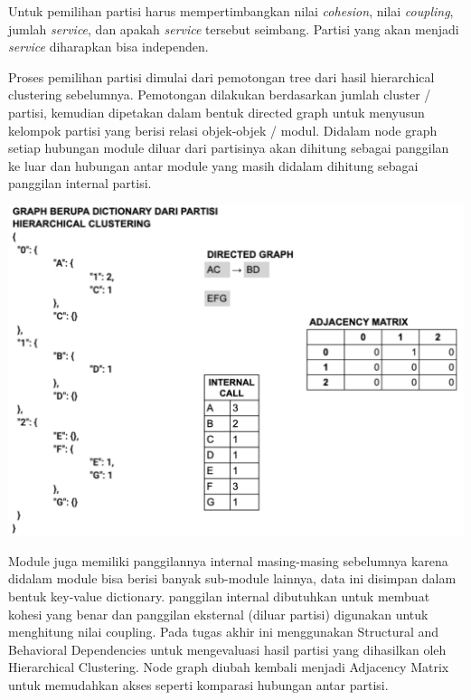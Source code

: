 Untuk pemilihan partisi harus mempertimbangkan nilai \textit{cohesion}, nilai \textit{coupling}, jumlah \textit{service}, dan apakah \textit{service} tersebut seimbang. Partisi yang akan menjadi \textit{service} diharapkan bisa independen. 

Proses pemilihan partisi dimulai dari pemotongan tree dari hasil hierarchical clustering sebelumnya. Pemotongan dilakukan berdasarkan jumlah cluster / partisi, kemudian  dipetakan dalam bentuk directed graph untuk menyusun kelompok partisi yang berisi relasi objek-objek / modul. Didalam node graph setiap hubungan module diluar dari partisinya akan dihitung sebagai panggilan ke luar dan hubungan antar module yang masih didalam  dihitung sebagai panggilan internal partisi.

\begin{center}
	\includegraphics[width=14cm]{img/bab_3/eval_detail1.png}
	\label{fig:asd}
\end{center}

Module juga memiliki panggilannya internal masing-masing sebelumnya karena didalam module bisa berisi banyak sub-module lainnya, data ini disimpan dalam bentuk key-value dictionary. panggilan internal dibutuhkan untuk membuat kohesi yang benar dan panggilan eksternal (diluar partisi) digunakan untuk menghitung nilai coupling.  Pada tugas akhir ini menggunakan Structural and Behavioral Dependencies untuk mengevaluasi hasil partisi yang dihasilkan oleh Hierarchical Clustering. Node graph diubah kembali menjadi Adjacency Matrix untuk memudahkan akses seperti komparasi hubungan antar partisi. 

